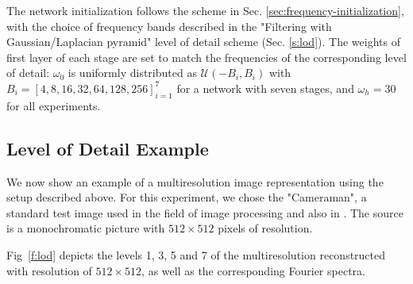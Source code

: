 The network initialization follows the scheme in Sec. \ref{sec:frequency-initialization}, with the choice of frequency bands described in the "Filtering with Gaussian/Laplacian pyramid" level of detail scheme (Sec. \ref{s:lod}). The weights of first layer of each stage are set to match the frequencies of the corresponding level of detail: $\omega_0$ is uniformly distributed as $ \mathcal{U}(-B_i, B_i)$ with $B_i = [4, 8, 16, 32, 64, 128, 256]_{i=1}^7$ for a network with seven stages, and $\omega_h = 30$ for all experiments.


\subsection{Level of Detail Example}
\label{ss:LOD}

We now show an example of a multiresolution image representation using the setup described above. For this experiment, we chose the "Cameraman", a standard test image used in the field of image processing and also in \citet{sitzmann2019siren}.
The source is a monochromatic picture with $512\times 512$ pixels of resolution.

Fig~\ref{f:lod} depicts the levels 1, 3, 5 and 7 of the multiresolution reconstructed with resolution of $512\times 512$, as well as the corresponding Fourier spectra. 

